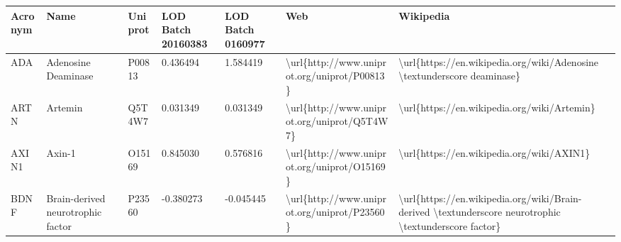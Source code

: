 \begin{table}[]
\centering
\begin{tabular}{lllllll}
\hline
\rowcolor[HTML]{FFFFC7} 
Acronym                       & Name                                                          & Uniprot & LOD Batch 20160383 & LOD Batch 0160977 & Web                                                          & Wikipedia                                                                                                                                                                                                                                                                                          \\ \hline
\multicolumn{1}{l|}{ADA}      & Adenosine Deaminase                                           & P00813  & 0.436494           & 1.584419          & \textbackslash{}url\{http://www.uniprot.org/uniprot/P00813\} & \textbackslash{}url\{https://en.wikipedia.org/wiki/Adenosine \textbackslash{}textunderscore deaminase\}                                                                                                                                                                                            \\
\multicolumn{1}{l|}{ARTN}     & Artemin                                                       & Q5T4W7  & 0.031349           & 0.031349          & \textbackslash{}url\{http://www.uniprot.org/uniprot/Q5T4W7\} & \textbackslash{}url\{https://en.wikipedia.org/wiki/Artemin\}                                                                                                                                                                                                                                       \\
\multicolumn{1}{l|}{AXIN1}    & Axin-1                                                        & O15169  & 0.845030           & 0.576816          & \textbackslash{}url\{http://www.uniprot.org/uniprot/O15169\} & \textbackslash{}url\{https://en.wikipedia.org/wiki/AXIN1\}                                                                                                                                                                                                                                         \\
\multicolumn{1}{l|}{BDNF}     & Brain-derived neurotrophic factor                             & P23560  & -0.380273          & -0.045445         & \textbackslash{}url\{http://www.uniprot.org/uniprot/P23560\} & \textbackslash{}url\{https://en.wikipedia.org/wiki/Brain-derived \textbackslash{}textunderscore neurotrophic \textbackslash{}textunderscore factor\}                                                                                                                                               \\

\end{tabular}
\end{table}
